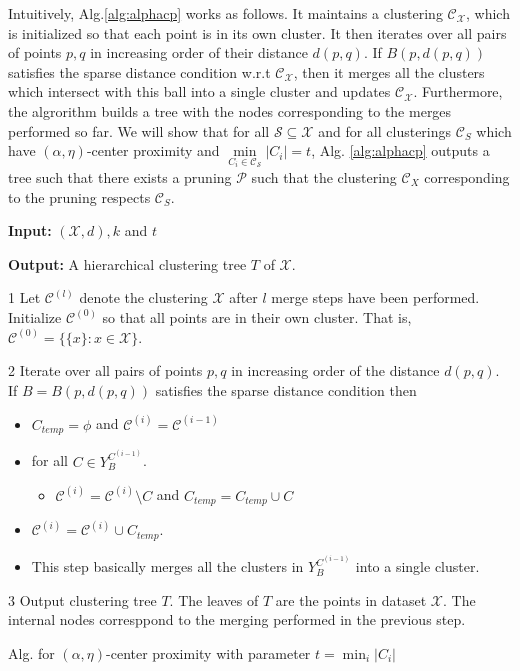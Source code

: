 \documentclass[11pt]{article}
\newcommand{\mc}{\mathcal}
\newenvironment{alg}{
    \begin{list}{}{
        \setlength{\itemsep}{2pt}
        \setlength{\parsep}{0pt}
        \setlength{\parskip}{0pt}
        \setlength{\topsep}{1pt}
    }
}
{
    \end{list}
}
\begin{document}
Intuitively, Alg.\ref{alg:alphacp} works as follows. It maintains a clustering $\mc C_{\mc X}$, which is initialized so that  each point is in its own cluster. It then iterates over all pairs of points $p, q$ in increasing order of their distance $d(p, q)$. If $B(p, d(p,q))$ satisfies the sparse distance condition w.r.t $\mc C_{\mc X}$, then it merges all the clusters which intersect with this ball into a single cluster and updates $\mc C_{\mc X}$. Furthermore, the algrorithm builds a tree with the nodes corresponding to the merges performed so far. We will show that for all $\mc S \subseteq \mc X$ and for all clusterings $\mc C_S$ which have $(\alpha, \eta)$-center proximity and $\min\limits_{C_i \in {\mc C}_{\mc S}} |C_i| = t$, Alg. \ref{alg:alphacp} outputs a tree such that there exists a pruning $\mc P$ such that the clustering $\mc C_X$ corresponding to the pruning respects $\mc C_S$. %

\begin{algorithm}[!ht]
\begin{alg}
	\item \textbf{Input: } $(\mc X, d), k$ and $t$
	\item \textbf{Output: } A hierarchical clustering tree $T$ of $\mc X$.
	\item[1] Let $\mc C^{(l)}$ denote the clustering $\mc X$ after $l$ merge steps have been performed. Initialize $\mc C^{(0)}$ so that all points are in their own cluster. That is, $\mc C^{(0)} = \{ \{x\}: x \in \mc X\}$.
	\item[2] Iterate over all pairs of points $p, q$ in increasing order of the distance $d(p, q)$. If $B = B(p, d(p, q))$ satisfies the sparse distance condition then
	\begin{itemize}
	\renewcommand\labelitemi{}
		\item $C_{temp} = \phi$ and $\mc C^{(i)} = \mc C^{(i-1)}$
		\item for all $C \in Y_B^{C^{(i-1)}}$.
		\begin{itemize}
		\renewcommand\labelitemii{}
			\item $\mc C^{(i)} = \mc C^{(i)} \setminus C$ and $C_{temp} = C_{temp} \cup C$
		\end{itemize}
		\item $\mc C^{(i)} = \mc C^{(i)} \cup C_{temp}$.
		\item This step basically merges all the clusters in $Y_B^{C^{(i-1)}}$ into a single cluster.
	\end{itemize}
	\item[3] Output clustering tree $T$. The leaves of $T$ are the points in dataset $\mc X$. The internal nodes corresppond to the merging performed in the previous step.
\end{alg}
\caption{Alg. for $(\alpha, \eta)$-center proximity with parameter $t = \min_i |C_i|$}
\label{alg:alphacp}
\end{algorithm}
\end{document}
